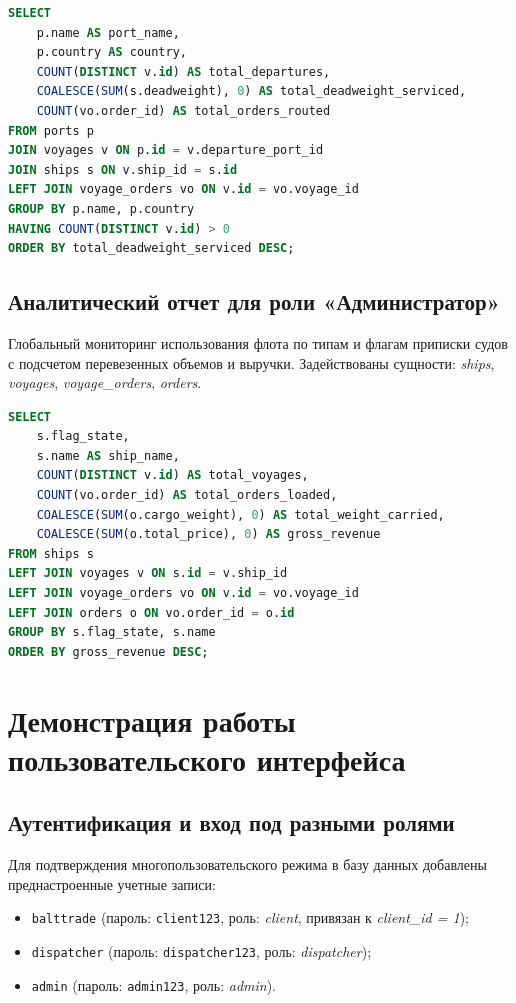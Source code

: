 \documentclass[a4paper,14pt]{article}
\begin{document}
\begin{lstlisting}[language=SQL]
SELECT 
    p.name AS port_name,
    p.country AS country,
    COUNT(DISTINCT v.id) AS total_departures,
    COALESCE(SUM(s.deadweight), 0) AS total_deadweight_serviced,
    COUNT(vo.order_id) AS total_orders_routed
FROM ports p
JOIN voyages v ON p.id = v.departure_port_id
JOIN ships s ON v.ship_id = s.id
LEFT JOIN voyage_orders vo ON v.id = vo.voyage_id
GROUP BY p.name, p.country
HAVING COUNT(DISTINCT v.id) > 0
ORDER BY total_deadweight_serviced DESC;
\end{lstlisting}

\subsection{Аналитический отчет для роли «Администратор»}
Глобальный мониторинг использования флота по типам и флагам приписки судов с подсчетом перевезенных объемов и выручки. Задействованы сущности: \textit{ships}, \textit{voyages}, \textit{voyage\_orders}, \textit{orders}.

\begin{lstlisting}[language=SQL]
SELECT 
    s.flag_state,
    s.name AS ship_name,
    COUNT(DISTINCT v.id) AS total_voyages,
    COUNT(vo.order_id) AS total_orders_loaded,
    COALESCE(SUM(o.cargo_weight), 0) AS total_weight_carried,
    COALESCE(SUM(o.total_price), 0) AS gross_revenue
FROM ships s
LEFT JOIN voyages v ON s.id = v.ship_id
LEFT JOIN voyage_orders vo ON v.id = vo.voyage_id
LEFT JOIN orders o ON vo.order_id = o.id
GROUP BY s.flag_state, s.name
ORDER BY gross_revenue DESC;
\end{lstlisting}

\newpage
\section{Демонстрация работы пользовательского интерфейса}

\subsection{Аутентификация и вход под разными ролями}
Для подтверждения многопользовательского режима в базу данных добавлены преднастроенные учетные записи:
\begin{itemize}
    \item \texttt{balttrade} (пароль: \texttt{client123}, роль: \textit{client}, привязан к \textit{client\_id = 1});
    \item \texttt{dispatcher} (пароль: \texttt{dispatcher123}, роль: \textit{dispatcher});
    \item \texttt{admin} (пароль: \texttt{admin123}, роль: \textit{admin}).
\end{itemize}
\end{document}

